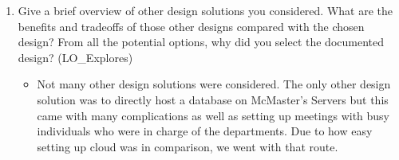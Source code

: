 \documentclass[12pt, titlepage]{article}
\begin{document}
\begin{enumerate}
\begin{itemize}
    \end{itemize}
    \item Give a brief overview of other design solutions you considered.  What
    are the benefits and tradeoffs of those other designs compared with the chosen
    design?  From all the potential options, why did you select the documented design?
    (LO\_Explores)
    \begin{itemize}
      \item Not many other design solutions were considered. The only other design solution was to directly host a database on McMaster's Servers but this came with many complications as well as setting up meetings with busy individuals who were in charge of the departments. Due to how easy setting up cloud was in comparison, we went with that route.
    \end{itemize}
\end{enumerate}
\end{document}
